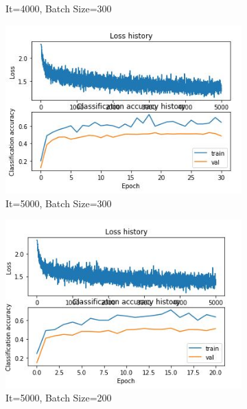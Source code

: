 \documentclass[
	12pt, %
]{fphw}
\begin{document}
\begin{figure}[h!]
\begin{subfigure}[b]{0.2\textwidth}
         \caption{It=4000, Batch Size=300}
     \end{subfigure}
      \hfill
     \begin{subfigure}[b]{0.2\textwidth}
         \centering
         \includegraphics[width=\textwidth]{img/Img_6.JPG}
         \caption{It=5000, Batch Size=300}
     \end{subfigure}
      \hfill
     \begin{subfigure}[b]{0.2\textwidth}
         \centering
         \includegraphics[width=\textwidth]{img/Img_7.JPG}
         \caption{It=5000, Batch Size=200}
     \end{subfigure}
      \hfill
     \begin{subfigure}[b]{0.2\textwidth}
         \centering

\end{subfigure}
\end{figure}
\end{document}
